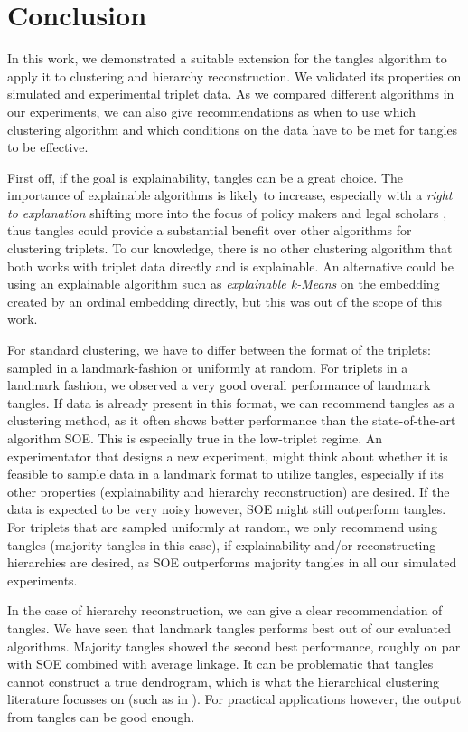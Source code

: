 \chapter{Conclusion}\label{conclusion}
In this work, we demonstrated a suitable extension for the tangles algorithm to apply it to clustering and hierarchy reconstruction. 
We validated its properties on simulated and experimental triplet data.  
As we compared different algorithms in our experiments, we can also give recommendations as when to use which clustering algorithm and which conditions on the data
have to be met for tangles to be effective. 

First off, if the goal is explainability, tangles can be a great choice. 
The importance of explainable algorithms is likely to increase, especially with 
a \textit{right to explanation} shifting more into the focus of policy makers and legal
scholars \citep{selbstMeaningfulInformationRight2017}, thus tangles could provide a substantial benefit over other algorithms for clustering triplets.
To our knowledge, there is no other clustering algorithm that both works with triplet data directly and is explainable. 
An alternative could be using an explainable algorithm such as \textit{explainable k-Means} \citep{moshkovitzExplainableKMeansKMedians2020} on the embedding created 
by an ordinal embedding directly, but this was out of the scope of this work. 

For standard clustering, we have to differ between the format of the triplets: sampled in a landmark-fashion or uniformly at random.
For triplets in a landmark fashion, we observed a very good overall performance of landmark tangles.
If data is already present in this format, we can recommend
tangles as a clustering method, as it often shows better performance than the state-of-the-art algorithm SOE. This is especially true in the low-triplet regime. 
An experimentator that designs a new experiment, might think about whether it is feasible to sample data in a landmark format to utilize tangles, 
especially if its other properties (explainability and hierarchy reconstruction) are desired. 
If the data is expected to be very noisy however, SOE might still outperform tangles.  
For triplets that are sampled uniformly at random, we only recommend using tangles (majority tangles in this case), if explainability and/or reconstructing hierarchies are desired, as SOE 
outperforms majority tangles in all our simulated experiments.

In the case of hierarchy reconstruction, we can give a clear recommendation of tangles. We have seen that landmark tangles performs best out of our evaluated algorithms. Majority tangles 
showed the second best performance, roughly on par with SOE combined with average linkage. 
It can be problematic that tangles cannot construct a true dendrogram, which is what the hierarchical clustering literature focusses on (such as in \cite{ghoshdastidarFoundationsComparisonBasedHierarchical2019}).  For practical applications however, the output from tangles can be good enough. 

